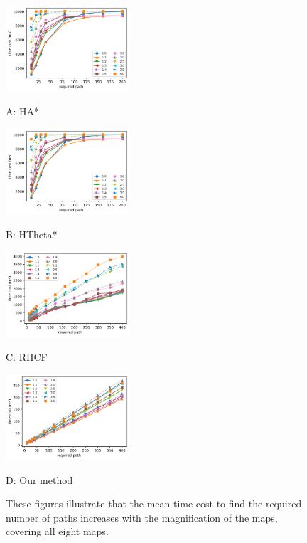 \documentclass[lettersize,journal]{IEEEtran}
\begin{document}
\begin{figure}[t] \scriptsize
\begin{minipage}{.245\linewidth}
  \centerline{\includegraphics[width=4.6cm]{HsAs_scale_cost_method_path_count.png}}
  \centerline{A: HA*}
\end{minipage}
\hfill
\begin{minipage}{.245\linewidth}
  \centerline{\includegraphics[width=4.6cm]{HsTs_scale_cost_method_path_count.png}}
  \centerline{B: HTheta*}
\end{minipage}
\hfill
\begin{minipage}{.245\linewidth}
  \centerline{\includegraphics[width=4.6cm]{RHCF_scale_cost_method_path_count.png}}
  \centerline{C: RHCF}
\end{minipage}
\hfill
\begin{minipage}{.245\linewidth}
  \centerline{\includegraphics[width=4.6cm]{RJ_scale_cost_method_path_count.png}}
  \centerline{D: Our method}
\end{minipage}
\vfill

\caption{These figures illustrate that the mean time cost to find the required number of paths increases with the magnification of the maps, covering all eight maps.}
\label{scale_cost_method_path_count}
\end{figure}
\end{document}
